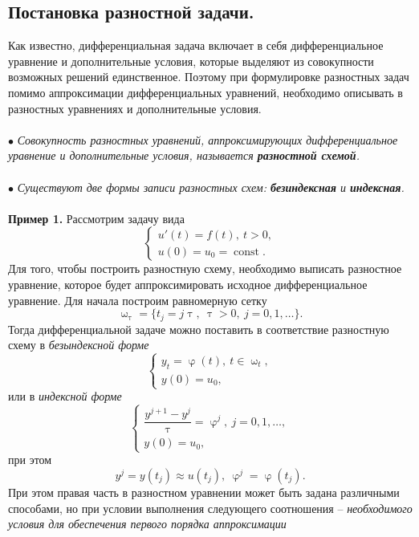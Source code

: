 \documentclass[a4paper, 12pt]{report}
\numberwithin{equation}{section}
\renewcommand{\varphi}{\upvarphi}
\renewcommand{\tau}{\uptau}
\renewcommand{\omega}{\upomega}
\newcommand{\const}{\operatorname{const}}
\begin{document}
\subsection{Постановка разностной задачи.}
Как известно, дифференциальная задача включает в себя дифференциальное уравнение и дополнительные условия, которые выделяют из совокупности возможных решений единственное. Поэтому при формулировке разностных задач помимо аппроксимации дифференциальных уравнений, необходимо описывать в разностных уравнениях и дополнительные условия.\\\\
$\bullet$ \textit{Совокупность разностных уравнений, аппроксимирующих дифференциальное уравнение и дополнительные условия, называется \textbf{разностной схемой}.}\\\\
$\bullet$ \textit{Существуют две формы записи разностных схем: \textbf{безиндексная} и \textbf{индексная}.}\\\\
\textbf{Пример 1.} Рассмотрим задачу вида 
\begin{equation}
\begin{cases}
u'(t) = f(t),\ t>0,\\
u(0) = u_0 = \const.
\end{cases}
\end{equation}
Для того, чтобы построить разностную схему, необходимо выписать разностное уравнение, которое будет аппроксимировать исходное дифференциальное уравнение. Для начала построим равномерную сетку $$\omega_\tau = \{t_j = j\tau,\ \tau>0,\ j=0,1,\ldots\}.$$
Тогда дифференциальной задаче можно поставить в соответствие разностную схему в \textit{безындексной форме}
\begin{equation}
\begin{cases}
y_t = \varphi(t),\ t \in \omega _t,\\
y(0) = u_0,
\end{cases}
\end{equation}
или в \textit{индексной форме}
\begin{equation}
\begin{cases}
	\dfrac{y^{j+1}-y^j}{\tau} = \varphi^j,\ j=0,1,\ldots,\\
	y(0) = u_0,
\end{cases}
\end{equation}
при этом $$y^j = y(t_j)\approx u(t_j),\ \varphi^j = \varphi(t_j).$$
При этом правая часть в разностном уравнении может быть задана различными способами, но при условии выполнения следующего соотношения -- \textit{необходимого условия для обеспечения первого порядка аппроксимации}
\end{document}
